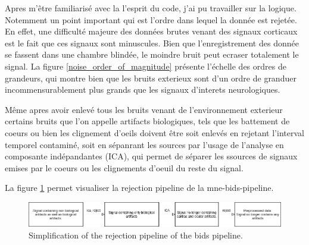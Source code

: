 Apres m'être familiarisé avec la l'esprit du code, j'ai pu travailler sur la logique. Notemment un point important qui est l'ordre dans lequel la donnée est rejetée. En effet, une difficulté majeure des données brutes venant des signaux corticaux est le fait que ces signaux sont minuscules. Bien que l'enregistrement des donnée se fassent dans une chambre blindée, le moindre bruit peut ecraser totalement le signal. La figure \ref{noise_order_of_magnitude} présente l'échelle des ordres de grandeurs, qui montre bien que les bruits exterieux sont d'un ordre de granduer incommensurablement plus grands que les signaux d'interets neurologiques.

Même apres avoir enlevé tous les bruits venant de l'environnement exterieur certains bruits que l'on appelle artifacts biologiques, tels que les battement de coeurs ou bien les clignement d'oeils doivent être soit enlevés en rejetant l'interval temporel contaminé, soit en sépanrant les sources par l'usage de l'analyse en composante indépandantes (ICA), qui permet de séparer les ssources de signaux emises par le coeurs ou les clignements d'oeuil du reste du signal.

La figure \ref{rejection_pipeline} permet visualiser la rejection pipeline de la mne-bids-pipeline.

\begin{figure}[ht]
    \centering
    \includegraphics[width=15cm]{images_report/preprocessing/rejection_pipeline.png}
    \caption[Simplification of the rejection pipeline of the bids pipeline.]%
    {Simplification of the rejection pipeline of the bids pipeline.}
    \label{rejection_pipeline}
\end{figure}


